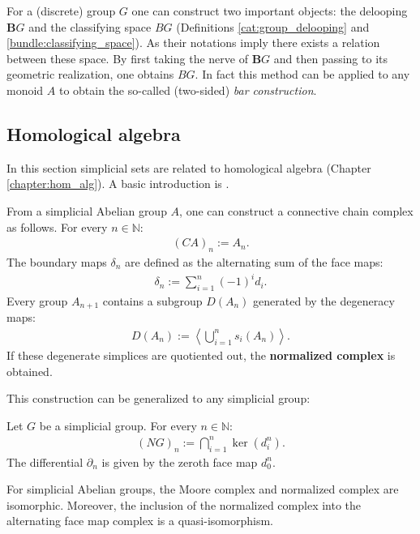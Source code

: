     \begin{property}
        For a (discrete) group $G$ one can construct two important objects: the delooping $\mathbf{B}G$ and the classifying space $BG$ (Definitions \ref{cat:group_delooping} and \ref{bundle:classifying_space}). As their notations imply there exists a relation between these space. By first taking the nerve of $\mathbf{B}G$ and then passing to its geometric realization, one obtains $BG$. In fact this method can be applied to any monoid $A$ to obtain the so-called (two-sided) \textit{bar construction}.
    \end{property}

\subsection{Homological algebra}

    In this section simplicial sets are related to homological algebra (Chapter \ref{chapter:hom_alg}). A basic introduction is \cite{master2020homology}.

    \begin{construct}
        From a simplicial Abelian group $A$, one can construct a connective chain complex as follows. For every $n\in\mathbb{N}$:
        \begin{gather}
            (CA)_n := A_n.
        \end{gather}
        The boundary maps $\delta_n$ are defined as the alternating sum of the face maps:
        \begin{gather}
            \delta_n := \sum_{i=1}^n(-1)^id_i.
        \end{gather}
        Every group $A_{n+1}$ contains a subgroup $D(A_n)$ generated by the degeneracy maps:
        \begin{gather}
            D(A_n) := \left\langle\bigcup_{i=1}^ns_i(A_n)\right\rangle.
        \end{gather}
        If these degenerate simplices are quotiented out, the \textbf{normalized complex} is obtained.
    \end{construct}
    This construction can be generalized to any simplicial group:
    \begin{construct}
        Let $G$ be a simplicial group. For every $n\in\mathbb{N}$:
        \begin{gather}
            (NG)_n := \bigcap_{i=1}^n\ker(d^n_i).
        \end{gather}
        The differential $\partial_n$ is given by the zeroth face map $d^n_0$.
    \end{construct}
    \begin{property}[Equivalence]
        For simplicial Abelian groups, the Moore complex and normalized complex are isomorphic. Moreover, the inclusion of the normalized complex into the alternating face map complex is a quasi-isomorphism.
    \end{property}

